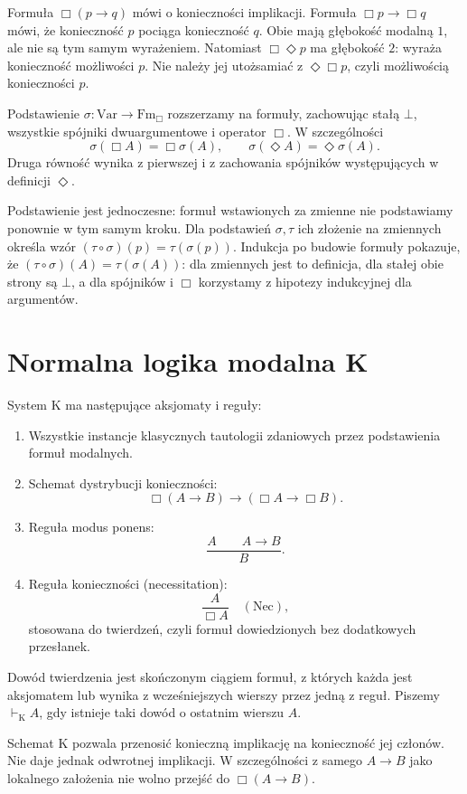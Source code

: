 \begin{przyklad}
\label{ex:ncl-modal-scope}
Formuła $\Box(p\to q)$ mówi o konieczności
implikacji. Formuła $\Box p\to\Box q$ mówi,
że konieczność $p$ pociąga konieczność $q$.
Obie mają głębokość modalną $1$, ale nie są
tym samym wyrażeniem.
Natomiast $\Box\Diamond p$ ma głębokość $2$:
wyraża konieczność możliwości $p$.
Nie należy jej utożsamiać z $\Diamond\Box p$,
czyli możliwością konieczności $p$.
\end{przyklad}

\begin{definicja}
\label{def:ncl-modal-substitution}
Podstawienie $\sigma:\mathrm{Var}\to\mathrm{Fm}_{\Box}$
rozszerzamy na formuły, zachowując stałą $\bot$,
wszystkie spójniki dwuargumentowe i operator $\Box$.
W szczególności
\[
 \sigma(\Box A)=\Box\sigma(A),\qquad
 \sigma(\Diamond A)=\Diamond\sigma(A).
\]
Druga równość wynika z pierwszej i z zachowania
spójników występujących w definicji $\Diamond$.
\end{definicja}
Podstawienie jest jednoczesne: formuł wstawionych
za zmienne nie podstawiamy ponownie w tym samym
kroku. Dla podstawień $\sigma,\tau$ ich złożenie
na zmiennych określa wzór
$(\tau\circ\sigma)(p)=\tau(\sigma(p))$.
Indukcja po budowie formuły pokazuje, że
$(\tau\circ\sigma)(A)=\tau(\sigma(A))$:
dla zmiennych jest to definicja, dla stałej
obie strony są $\bot$, a dla spójników i $\Box$
korzystamy z hipotezy indukcyjnej dla argumentów.

\section{Normalna logika modalna K}

\begin{definicja}
\label{def:ncl-modal-K}
System $\mathrm K$ ma następujące aksjomaty i reguły:
\begin{enumerate}
\item Wszystkie instancje klasycznych tautologii
      zdaniowych przez podstawienia formuł modalnych.
\item Schemat dystrybucji konieczności:
\[
 \tag{K}\label{eq:ncl-modal-axiom-K}
 \Box(A\to B)\to(\Box A\to\Box B).
\]
\item Reguła modus ponens:
\[
 \frac{A\qquad A\to B}{B}.
\]
\item Reguła konieczności (necessitation):
\[
 \frac{A}{\Box A}\quad(\mathrm{Nec}),
\]
      stosowana do twierdzeń, czyli formuł
      dowiedzionych bez dodatkowych przesłanek.
\end{enumerate}
Dowód twierdzenia jest skończonym ciągiem formuł,
z których każda jest aksjomatem lub wynika
z wcześniejszych wierszy przez jedną z reguł.
Piszemy $\vdash_{\mathrm K}A$, gdy istnieje taki
dowód o ostatnim wierszu $A$.
\end{definicja}
Schemat K pozwala przenosić konieczną implikację
na konieczność jej członów. Nie daje jednak
odwrotnej implikacji. W szczególności z samego
$A\to B$ jako lokalnego założenia nie wolno
przejść do $\Box(A\to B)$.

